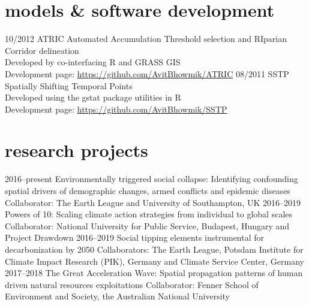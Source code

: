 \documentclass[]{friggeri-cv} %
\begin{document}
\section{models \& software development}

\begin{entrylist}
\entry
{\small{10/2012}}
{ATRIC}
{}
{Automated Accumulation Threshold selection and RIparian Corridor delineation \\
Developed by co-interfacing R and GRASS GIS \\
Development page: \href{https://github.com/AvitBhowmik/ATRIC}{https://github.com/AvitBhowmik/ATRIC}}
\entry
{\small{08/2011}}
{SSTP}
{}
{Spatially Shifting Temporal Points \\
Developed using the gstat package utilities in R \\
Development page: \href{https://github.com/AvitBhowmik/SSTP}{https://github.com/AvitBhowmik/SSTP}}
\end{entrylist}

\section{research projects}

\begin{entrylist}
\entry
{\small{2016--present}}
{Environmentally triggered social collapse: Identifying confounding spatial drivers of demographic changes, armed conflicts and epidemic diseases}
{}
{Collaborator: The Earth League and University of Southampton, UK}
\entry
{\small{2016--2019}}
{Powers of 10: Scaling climate action strategies from individual to global
scales}
{}
{Collaborator: National University for Public Service, Budapest, Hungary and Project Drawdown}
\entry
{\small{2016--2019}}
{Social tipping elements instrumental for decarbonization by 2050}
{}
{Collaborators: The Earth League, Potsdam Institute for Climate Impact Research (PIK), Germany and Climate Service Center, Germany}
\entry
{\small{2017--2018}}
{The Great Acceleration Wave: Spatial propagation patterns of human driven natural resources exploitations}
{}
{Collaborator: Fenner School of Environment and Society, the Australian National University}
\end{entrylist}
\end{document}
